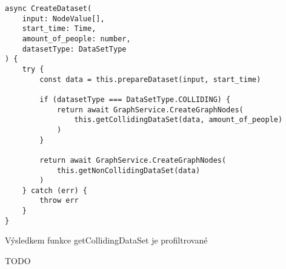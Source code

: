 \begin{lstlisting}
async CreateDataset(
    input: NodeValue[],
    start_time: Time,
    amount_of_people: number,
    datasetType: DataSetType
) {
    try {
	    const data = this.prepareDataset(input, start_time)

	    if (datasetType === DataSetType.COLLIDING) {
		    return await GraphService.CreateGraphNodes(
			    this.getCollidingDataSet(data, amount_of_people)
		    )
	    }

	    return await GraphService.CreateGraphNodes(
		    this.getNonCollidingDataSet(data)
	    )
    } catch (err) {
	    throw err
    }
}
\end{lstlisting}

Výsledkem funkce getCollidingDataSet je profiltrované 

TODO
